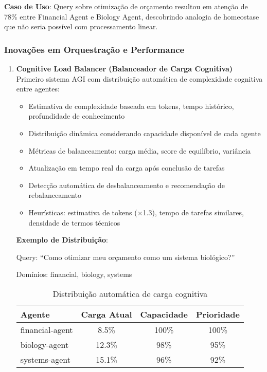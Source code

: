 \documentclass[11pt]{article}
\begin{document}
\textbf{Caso de Uso}: Query sobre otimização de orçamento resultou em atenção de 78\% entre Financial Agent e Biology Agent, descobrindo analogia de homeostase que não seria possível com processamento linear.

\subsubsection{Inovações em Orquestração e Performance}

\begin{enumerate}
    \item \textbf{Cognitive Load Balancer (Balanceador de Carga Cognitiva)} \\
    Primeiro sistema AGI com distribuição automática de complexidade cognitiva entre agentes:
    \begin{itemize}
        \item Estimativa de complexidade baseada em tokens, tempo histórico, profundidade de conhecimento
        \item Distribuição dinâmica considerando capacidade disponível de cada agente
        \item Métricas de balanceamento: carga média, score de equilíbrio, variância
        \item Atualização em tempo real da carga após conclusão de tarefas
        \item Detecção automática de desbalanceamento e recomendação de rebalanceamento
        \item Heurísticas: estimativa de tokens (×1.3), tempo de tarefas similares, densidade de termos técnicos
    \end{itemize}

\textbf{Exemplo de Distribuição}:

Query: ``Como otimizar meu orçamento como um sistema biológico?''

Domínios: financial, biology, systems

\begin{table}[H]
\centering
\begin{tabular}{@{}lccc@{}}
\toprule
\textbf{Agente} & \textbf{Carga Atual} & \textbf{Capacidade} & \textbf{Prioridade} \\ \midrule
financial-agent & 8.5\% & 100\% & 100\% \\
biology-agent & 12.3\% & 98\% & 95\% \\
systems-agent & 15.1\% & 96\% & 92\% \\ \bottomrule
\end{tabular}
\caption{Distribuição automática de carga cognitiva}
\end{table}


\end{enumerate}
\end{document}
